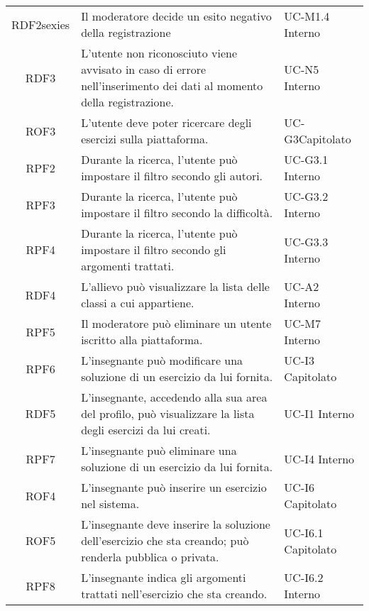 \begin{tabularx}{\textwidth}{| c | p{10cm} | X |}
		RDF2sexies & Il moderatore decide un esito negativo della registrazione & UC-M1.4 \newline Interno\\
		RDF3 & L'utente non riconosciuto viene avvisato in caso di errore nell'inserimento dei dati al momento della registrazione. & UC-N5 \newline Interno\\
		ROF3 & L'utente deve poter ricercare degli esercizi sulla piattaforma. & UC-G3\newline Capitolato\\
		RPF2 & Durante la ricerca, l'utente può impostare il filtro secondo gli autori. & UC-G3.1 \newline Interno\\
		RPF3 & Durante la ricerca, l'utente può impostare il filtro secondo la difficoltà. & UC-G3.2 \newline Interno\\
		RPF4 & Durante la ricerca, l'utente può impostare il filtro secondo gli argomenti trattati. & UC-G3.3 \newline Interno\\
		RDF4 & L'allievo può visualizzare la lista delle classi a cui appartiene. & UC-A2 \newline Interno\\
		RPF5 & Il moderatore può eliminare un utente iscritto alla piattaforma. & UC-M7 \newline Interno\\
		RPF6 & L'insegnante può modificare una soluzione di un esercizio da lui fornita. & UC-I3 \newline Capitolato\\
		RDF5 & L'insegnante, accedendo alla sua area del profilo, può visualizzare la lista degli esercizi da lui creati. & UC-I1 \newline Interno\\
		RPF7 & L'insegnante può eliminare una soluzione di un esercizio da lui fornita. & UC-I4 \newline Interno\\
		ROF4 & L'insegnante può inserire un esercizio nel sistema. & UC-I6 \newline Capitolato\\
		ROF5 & L'insegnante deve inserire la soluzione dell'esercizio che sta creando; può renderla pubblica o privata. & UC-I6.1 \newline Capitolato\\
		RPF8 & L'insegnante indica gli argomenti trattati nell'esercizio che sta creando. & UC-I6.2 \newline Interno\\

\end{tabularx}
